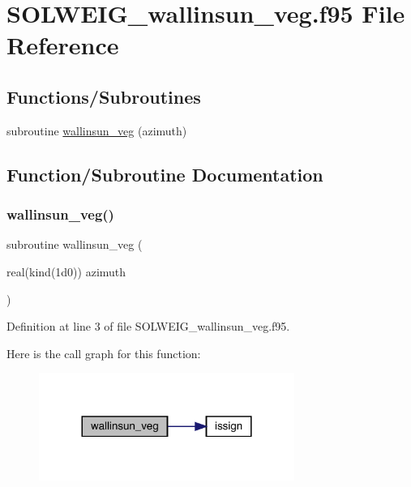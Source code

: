 \hypertarget{_s_o_l_w_e_i_g__wallinsun__veg_8f95}{}\section{S\+O\+L\+W\+E\+I\+G\+\_\+wallinsun\+\_\+veg.\+f95 File Reference}
\label{_s_o_l_w_e_i_g__wallinsun__veg_8f95}
\subsection*{Functions/\+Subroutines}
\begin{DoxyCompactItemize}
\item 
subroutine \hyperlink{_s_o_l_w_e_i_g__wallinsun__veg_8f95_ac197cb187740efb6d1753ae49cfbc632}{wallinsun\+\_\+veg} (azimuth)
\end{DoxyCompactItemize}


\subsection{Function/\+Subroutine Documentation}
\mbox{\label{_s_o_l_w_e_i_g__wallinsun__veg_8f95_ac197cb187740efb6d1753ae49cfbc632}} 
\subsubsection{\texorpdfstring{wallinsun\+\_\+veg()}{wallinsun\_veg()}}
{\footnotesize\ttfamily subroutine wallinsun\+\_\+veg (\begin{DoxyParamCaption}\item[{real(kind(1d0))}]{azimuth }\end{DoxyParamCaption})}



Definition at line 3 of file S\+O\+L\+W\+E\+I\+G\+\_\+wallinsun\+\_\+veg.\+f95.

Here is the call graph for this function\+:\nopagebreak
\begin{figure}[H]
\begin{center}
\leavevmode
\includegraphics[width=236pt]{_s_o_l_w_e_i_g__wallinsun__veg_8f95_ac197cb187740efb6d1753ae49cfbc632_cgraph}
\end{center}
\end{figure}
